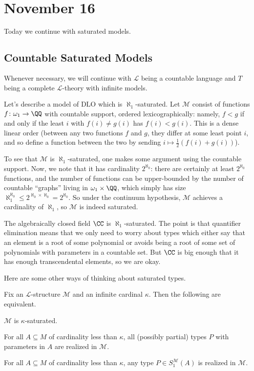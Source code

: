 \documentclass[../notes.tex]{subfiles}
\begin{document}
\section{November 16}

Today we continue with saturated models.

\subsection{Countable Saturated Models}
Whenever necessary, we will continue with $\mathcal L$ being a countable language and $T$ being a complete $\mathcal L$-theory with infinite models.
\begin{example}
	Let's describe a model of $\mathrm{DLO}$ which is $\aleph_1$-saturated. Let $\mathcal M$ consist of functions $f\colon\omega_1\to\QQ$ with countable support, ordered lexicographically: namely, $f<g$ if and only if the least $i$ with $f(i)\ne g(i)$ has $f(i)<g(i)$. This is a dense linear order (between any two functions $f$ and $g$, they differ at some least point $i$, and so define a function between the two by sending $i\mapsto\frac12(f(i)+g(i))$).

	To see that $\mathcal M$ is $\aleph_1$-saturated, one makes some argument using the countable support. Now, we note that it has cardinality $2^{\aleph_0}$: there are certainly at least $2^{\aleph_0}$ functions, and the number of functions can be upper-bounded by the number of countable ``graphs'' living in $\omega_1\times\QQ$, which simply has size $\aleph_1^{\aleph_0}\le2^{\aleph_0\times\aleph_0}=2^{\aleph_0}$. So under the continuum hypothesis, $\mathcal M$ achieves a cardinality of $\aleph_1$, so $\mathcal M$ is indeed saturated.
\end{example}
\begin{example}
	The algebraically closed field $\CC$ is $\aleph_1$-saturated. The point is that quantifier elimination means that we only need to worry about types which either say that an element is a root of some polynomial or avoids being a root of some set of polynomials with parameters in a countable set. But $\CC$ is big enough that it has enough transcendental elements, so we are okay.
\end{example}
Here are some other ways of thinking about saturated types.
\begin{proposition}
	Fix an $\mathcal L$-structure $\mathcal M$ and an infinite cardinal $\kappa$. Then the following are equivalent.
	\begin{listalph}
		\item $\mathcal M$ is $\kappa$-saturated.
		\item For all $A\subseteq M$ of cardinality less than $\kappa$, all (possibly partial) types $P$ with parameters in $A$ are realized in $\mathcal M$.
		\item For all $A\subseteq M$ of cardinality less than $\kappa$, any type $P\in S_1^\mathcal M(A)$ is realized in $\mathcal M$.
	\end{listalph}
\end{proposition}
\end{document}
